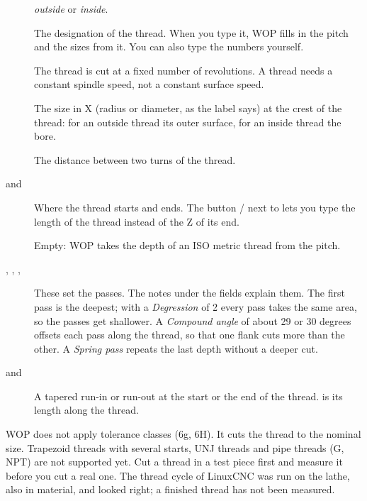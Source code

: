 \begin{description}
\item[] \emph{outside} or \emph{inside}.
\item[] The designation of the thread. When you type it, WOP fills in the pitch and the sizes from it. You can also type the numbers yourself.
\item[] The thread is cut at a fixed number of revolutions. A thread needs a constant spindle speed, not a constant surface speed.
\item[] The size in X (radius or diameter, as the label says) at the crest of the thread: for an outside thread its outer surface, for an inside thread the bore.
\item[] The distance between two turns of the thread.
\item[ and ] Where the thread starts and ends. The button  /  next to  lets you type the length of the thread instead of the Z of its end.
\item[] Empty: WOP takes the depth of an ISO metric thread from the pitch.
\item[, , , ] These set the passes. The notes under the fields explain them. The first pass is the deepest; with a \emph{Degression} of 2 every pass takes the same area, so the passes get shallower. A \emph{Compound angle} of about 29 or 30 degrees offsets each pass along the thread, so that one flank cuts more than the other. A \emph{Spring pass} repeats the last depth without a deeper cut.
\item[ and ] A tapered run-in or run-out at the start or the end of the thread.  is its length along the thread.
\end{description}

\begin{notebox}
WOP does not apply tolerance classes (6g, 6H). It cuts the thread to the nominal size. Trapezoid threads with several starts, UNJ threads and pipe threads (G, NPT) are not supported yet. Cut a thread in a test piece first and measure it before you cut a real one. The thread cycle of LinuxCNC was run on the lathe, also in material, and looked right; a finished thread has not been measured.
\end{notebox}

